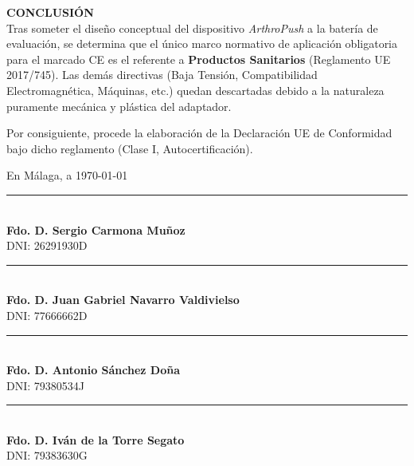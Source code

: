 \documentclass[11pt,a4paper]{article}
\begin{document}
\noindent
\begin{minipage}{\textwidth}
    \textbf{\color{ArthroNavy}\large CONCLUSIÓN} \\
    
    \noindent Tras someter el diseño conceptual del dispositivo \textit{ArthroPush} a la batería de evaluación, se determina que el único marco normativo de aplicación obligatoria para el marcado CE es el referente a \textbf{Productos Sanitarios} (Reglamento UE 2017/745). Las demás directivas (Baja Tensión, Compatibilidad Electromagnética, Máquinas, etc.) quedan descartadas debido a la naturaleza puramente mecánica y plástica del adaptador. 
    
    \vspace{0.2cm}
    \noindent Por consiguiente, procede la elaboración de la Declaración UE de Conformidad bajo dicho reglamento (Clase I, Autocertificación).
\end{minipage}

\noindent\begin{minipage}{\textwidth}
    \begin{flushright}
        En Málaga, a \today
    \end{flushright}
    \vspace{2cm}

    \noindent
    \begin{minipage}[t]{0.45\textwidth}
        \centering
        \rule{6cm}{0.6pt} \\
        \textbf{Fdo. D. Sergio Carmona Muñoz} \\
        DNI: 26291930D
    \end{minipage}
    \hfill
    \begin{minipage}[t]{0.45\textwidth}
        \centering
        \rule{6cm}{0.6pt} \\
        \textbf{Fdo. D. Juan Gabriel Navarro Valdivielso} \\
        DNI: 77666662D
    \end{minipage}

    \vspace{2cm}

    \noindent
    \begin{minipage}[t]{0.45\textwidth}
        \centering
        \rule{6cm}{0.6pt} \\
        \textbf{Fdo. D. Antonio Sánchez Doña} \\
        DNI: 79380534J
    \end{minipage}
    \hfill
    \begin{minipage}[t]{0.45\textwidth}
        \centering
        \rule{6cm}{0.6pt} \\
        \textbf{Fdo. D. Iván de la Torre Segato} \\
        DNI: 79383630G
    \end{minipage}
\end{minipage}
\vspace{1cm}
\end{document}
